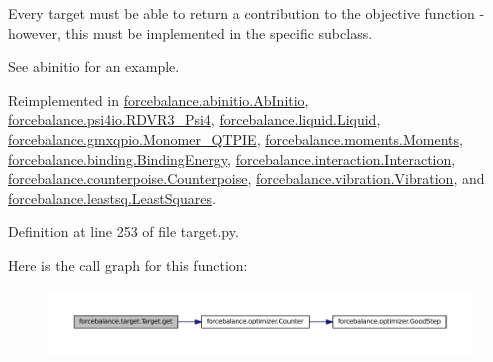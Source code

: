 \-Every target must be able to return a contribution to the objective function -\/ however, this must be implemented in the specific subclass. 

\-See abinitio for an example. 

\-Reimplemented in \hyperlink{classforcebalance_1_1abinitio_1_1AbInitio_a2bb3ed7209707f688ec8b731392466b5}{forcebalance.\-abinitio.\-Ab\-Initio}, \hyperlink{classforcebalance_1_1psi4io_1_1RDVR3__Psi4_a70936cb704ab5df307013cc6aa5b85c8}{forcebalance.\-psi4io.\-R\-D\-V\-R3\-\_\-\-Psi4}, \hyperlink{classforcebalance_1_1liquid_1_1Liquid_a802c4139e5c002fabdeab5de88093880}{forcebalance.\-liquid.\-Liquid}, \hyperlink{classforcebalance_1_1gmxqpio_1_1Monomer__QTPIE_a46144411b5166a1839bf954b584ca3a7}{forcebalance.\-gmxqpio.\-Monomer\-\_\-\-Q\-T\-P\-I\-E}, \hyperlink{classforcebalance_1_1moments_1_1Moments_a488308fb94a59f876efecb115b2e60b3}{forcebalance.\-moments.\-Moments}, \hyperlink{classforcebalance_1_1binding_1_1BindingEnergy_a263fadef13141ef341a01d1f538f85af}{forcebalance.\-binding.\-Binding\-Energy}, \hyperlink{classforcebalance_1_1interaction_1_1Interaction_a9fc3a40eb2852241ea440af719f6cf29}{forcebalance.\-interaction.\-Interaction}, \hyperlink{classforcebalance_1_1counterpoise_1_1Counterpoise_a5fd50a4bb7d5e939b7e99ac648b35d59}{forcebalance.\-counterpoise.\-Counterpoise}, \hyperlink{classforcebalance_1_1vibration_1_1Vibration_a3b20f6a97f3aba4f704056ed12a999a5}{forcebalance.\-vibration.\-Vibration}, and \hyperlink{classforcebalance_1_1leastsq_1_1LeastSquares_a2010f34730d88209b738d557cca09a1c}{forcebalance.\-leastsq.\-Least\-Squares}.



\-Definition at line 253 of file target.\-py.



\-Here is the call graph for this function\-:\nopagebreak
\begin{figure}[H]
\begin{center}
\leavevmode
\includegraphics[width=350pt]{classforcebalance_1_1target_1_1Target_a1389888302c49d529716cb45b13a6f5a_cgraph}
\end{center}
\end{figure}


